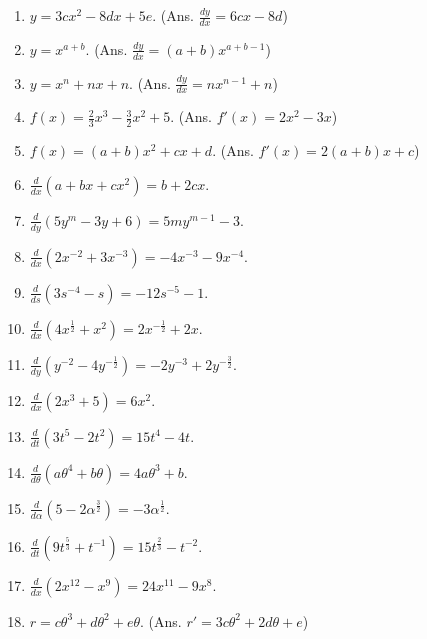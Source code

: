 \begin{enumerate}
\item
$y = 3cx^2 - 8dx + 5e$.  \qquad (Ans.	$\frac{dy}{dx} = 6cx - 8d$)

\item
$y = x^{a + b}$.   \qquad (Ans.	$\frac{dy}{dx} = (a + b)x^{a + b - 1}$)

\item
$y = x^n + nx + n$.   \qquad (Ans.	$\frac{dy}{dx} = nx^{n - 1} + n$)

\item
$f(x) = \frac{2}{3} x^3 - \frac{3}{2} x^2 + 5$.  \qquad (Ans. $f'(x) = 2x^2 - 3x$)


\item
$f(x) = (a + b)x^2 + cx + d$.   \qquad (Ans. $f'(x) = 2(a + b)x + c$)

\item
$\frac{d}{dx}(a + bx + cx^2) = b + 2cx$.

\item
$\frac{d}{dy}(5y^m - 3y + 6) = 5my^{m - 1} - 3$.

\item
$\frac{d}{dx}(2 x^{-2} + 3x^{-3}) = -4x^{-3} - 9x^{-4}$.

\item
$\frac{d}{ds}(3s^{-4} - s) = -12s^{-5} - 1$.

\item
$\frac{d}{dx}(4x^{\frac{1}{2}} + x^2) = 2x^{-\frac{1}{2}} + 2x$.

\item
$\frac{d}{dy}(y^{-2} - 4y^{-\frac{1}{2}}) = -2y^{-3} + 2y^{-\frac{3}{2}}$.

\item
$\frac{d}{dx}(2x^3 + 5) = 6x^2$.

\item
$\frac{d}{dt}(3t^5 - 2t^2) = 15t^4 - 4t$.

\item
$\frac{d}{d\theta}(a\theta^4 + b\theta) = 4a\theta^3 + b$.

\item
$\frac{d}{d\alpha}(5 - 2\alpha^{\frac{3}{2}}) = -3\alpha^{\frac{1}{2}}$.

\item
$\frac{d}{dt}(9t^{\frac{5}{3}} + t^{-1}) = 15t^{\frac{2}{3}} - t^{-2}$.

\item
$\frac{d}{dx}(2x^{12} - x^9) = 24x^{11} - 9x^8$.

\item
$r = c\theta^3 + d\theta^2 + e\theta$.   \qquad (Ans.	$r' = 3c\theta^2 + 2d\theta + e$)


\end{enumerate}
